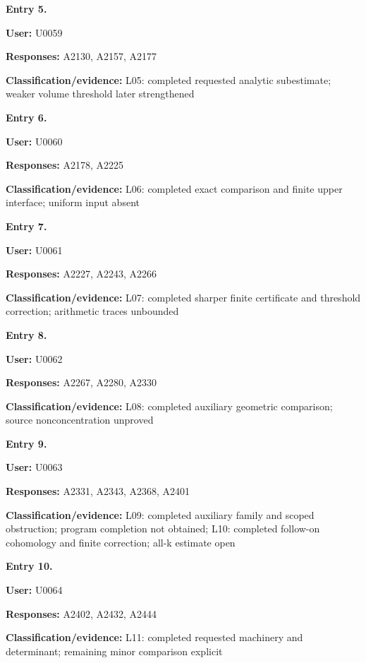 \textbf{Entry 5.}

\textbf{User:} U0059

\textbf{Responses:} A2130, A2157, A2177

\textbf{Classification/evidence:} L05: completed requested analytic
subestimate; weaker volume threshold later strengthened


\textbf{Entry 6.}

\textbf{User:} U0060

\textbf{Responses:} A2178, A2225

\textbf{Classification/evidence:} L06: completed exact comparison and
finite upper interface; uniform input absent


\textbf{Entry 7.}

\textbf{User:} U0061

\textbf{Responses:} A2227, A2243, A2266

\textbf{Classification/evidence:} L07: completed sharper finite
certificate and threshold correction; arithmetic traces unbounded


\textbf{Entry 8.}

\textbf{User:} U0062

\textbf{Responses:} A2267, A2280, A2330

\textbf{Classification/evidence:} L08: completed auxiliary geometric
comparison; source nonconcentration unproved


\textbf{Entry 9.}

\textbf{User:} U0063

\textbf{Responses:} A2331, A2343, A2368, A2401

\textbf{Classification/evidence:} L09: completed auxiliary family and
scoped obstruction; program completion not obtained; L10: completed
follow-on cohomology and finite correction; all-k estimate open


\textbf{Entry 10.}

\textbf{User:} U0064

\textbf{Responses:} A2402, A2432, A2444

\textbf{Classification/evidence:} L11: completed requested machinery and
determinant; remaining minor comparison explicit

